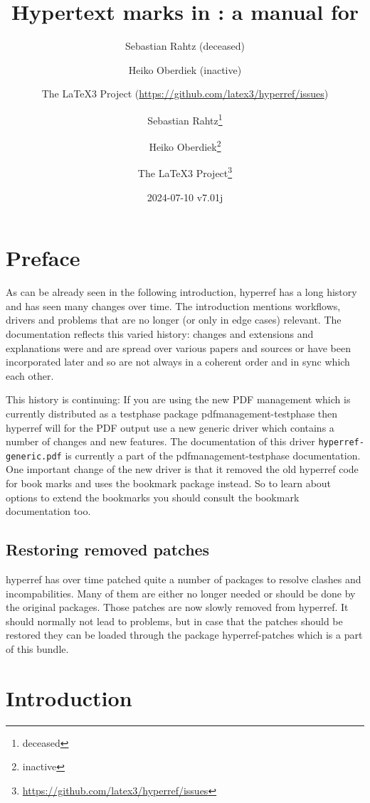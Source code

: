\documentclass{article}
\author{Sebastian Rahtz (deceased)\and
       Heiko Oberdiek (inactive)\and
       The \LaTeX3 Project (\url{https://github.com/latex3/hyperref/issues})}
\author{Sebastian Rahtz\thanks{deceased}\and
       Heiko Oberdiek\thanks{inactive}\and
       The \LaTeX3 Project\thanks{\url{https://github.com/latex3/hyperref/issues}}}
\title{Hypertext marks in \hologo{LaTeX}: a manual for \xpackage{hyperref}}
\date{2024-07-10 v7.01j}
\newcommand*{\xpackage}[1]{\textsf{#1}}
\begin{document}
\thispagestyle{empty}
\maketitle
\tableofcontents
\setcounter{tocdepth}{2}%

\section{Preface}
As can be already seen in the following introduction, \xpackage{hyperref}
has a long history and has seen many changes over time. The introduction
mentions workflows, drivers and problems that are no longer (or only in edge cases) relevant.
The documentation reflects this varied history: changes
and extensions and explanations were and are spread over various papers and sources or
have been incorporated later and so are not always in a coherent order and in sync which each other.

This history is continuing: If you are using the new  PDF management
which is currently distributed as a testphase package \xpackage{pdfmanagement-testphase}
then \xpackage{hyperref} will for the PDF output use a new generic driver which
contains a number of changes and new features. The documentation of this driver
\texttt{hyperref-generic.pdf}
is currently a part of the \xpackage{pdfmanagement-testphase} documentation.
One important change of the new driver is
that it removed the old \xpackage{hyperref} code for book marks and uses
the \xpackage{bookmark} package instead. So to learn
about options to extend the bookmarks you should consult the \xpackage{bookmark} documentation
too.

\subsection{Restoring removed patches}

\xpackage{hyperref} has over time patched quite a number of packages to resolve clashes and incompabilities.
Many of them are either no longer needed or should be done by the original packages.
Those patches are now slowly removed from \xpackage{hyperref}.  It should normally not lead to problems, but
in case that the patches should be restored they can be loaded through the package \xpackage{hyperref-patches} which
is a part of this bundle.



\section{Introduction}
\end{document}
